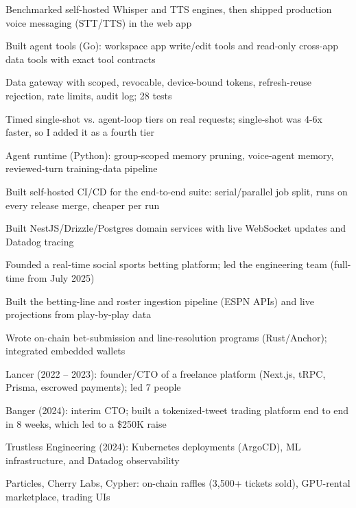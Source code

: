 \documentclass[print]{jack-resume}
\begin{document}
\begin{tightemize}
    \item Benchmarked self-hosted Whisper and TTS engines, then shipped production voice messaging (STT/TTS) in the web app
    \item Built agent tools (Go): workspace app write/edit tools and read-only cross-app data tools with exact tool contracts
    \item Data gateway with scoped, revocable, device-bound tokens, refresh-reuse rejection, rate limits, audit log; 28 tests
    \item Timed single-shot vs. agent-loop tiers on real requests; single-shot was 4-6x faster, so I added it as a fourth tier
    \item Agent runtime (Python): group-scoped memory pruning, voice-agent memory, reviewed-turn training-data pipeline
    \item Built self-hosted CI/CD for the end-to-end suite: serial/parallel job split, runs on every release merge, cheaper per run
\end{tightemize}
\sectionsep

\begin{tightemize}
    \item Built NestJS/Drizzle/Postgres domain services with live WebSocket updates and Datadog tracing
    \item Founded a real-time social sports betting platform; led the engineering team (full-time from July 2025)
    \item Built the betting-line and roster ingestion pipeline (ESPN APIs) and live projections from play-by-play data
    \item Wrote on-chain bet-submission and line-resolution programs (Rust/Anchor); integrated embedded wallets
\end{tightemize}
\sectionsep

\begin{tightemize}
    \item Lancer (2022 – 2023): founder/CTO of a freelance platform (Next.js, tRPC, Prisma, escrowed payments); led 7 people
    \item Banger (2024): interim CTO; built a tokenized-tweet trading platform end to end in 8 weeks, which led to a \$250K raise
    \item Trustless Engineering (2024): Kubernetes deployments (ArgoCD), ML infrastructure, and Datadog observability
    \item Particles, Cherry Labs, Cypher: on-chain raffles (3,500+ tickets sold), GPU-rental marketplace, trading UIs
\end{tightemize}
\sectionsep
\end{document}
